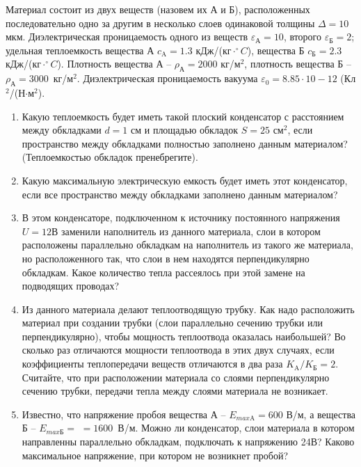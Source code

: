 
Материал состоит из двух веществ (назовем их А и Б), расположенных последовательно одно за другим в несколько слоев одинаковой толщины $\Delta = 10$ мкм. Диэлектрическая проницаемость одного из веществ $\varepsilon_\text{А} = 10$, второго $\varepsilon_\text{Б} = 2$; удельная теплоемкость вещества А $c_\text{A} = 1.3$ кДж/(кг$\cdot^{\circ}C$), вещества Б $c_\text{Б} = 2.3$ кДж/(кг$\cdot^{\circ}C$). Плотность вещества А – $\rho_\text{А} = 2000$ кг/м$^2$, плотность вещества Б – $\rho_\text{А} = 3000$~кг/м$^2$. Диэлектрическая проницаемость вакуума $\varepsilon_0 = 8.85\cdot10-12$ (Кл$^2$/(Н$\cdot$м$^2$).

\begin{enumerate}
    \item Какую теплоемкость будет иметь такой плоский конденсатор с расстоянием между обкладками $d = 1$ см и площадью обкладок $S = 25$ см$^2$, если пространство между обкладками полностью заполнено данным материалом? (Теплоемкостью обкладок пренебрегите).
    \item Какую максимальную электрическую емкость будет иметь этот конденсатор, если все пространство между обкладками заполнено данным материалом?
    \item В этом конденсаторе, подключенном к источнику постоянного напряжения $U = 12$В заменили наполнитель из данного материала, слои в котором расположены параллельно обкладкам на наполнитель из такого же материала, но расположенного так, что слои в нем находятся перпендикулярно обкладкам. Какое количество тепла рассеялось при этой замене на подводящих проводах? 
    \item Из данного материала делают теплоотводящую трубку. Как надо расположить материал при создании трубки (слои параллельно сечению трубки или перпендикулярно), чтобы мощность теплоотвода оказалась наибольшей? Во сколько раз отличаются мощности теплоотвода в этих двух случаях, если коэффициенты теплопередачи веществ отличаются в два раза $K_\text{A}/K_\text{Б} = 2$. Считайте, что при расположении материала со слоями перпендикулярно сечению трубки, передачи тепла между слоями материала не возникает.
    \item Известно, что напряжение пробоя вещества А – $E_{max\text{A}} = 600$ В/м, а вещества Б – $E_{max\text{Б}} =$ \linebreak $= 1600$~В/м.  Можно ли конденсатор, слои материала в котором направленны параллельно обкладкам, подключать к напряжению 24В? Каково максимальное напряжение, при котором не возникнет пробой?
\end{enumerate}